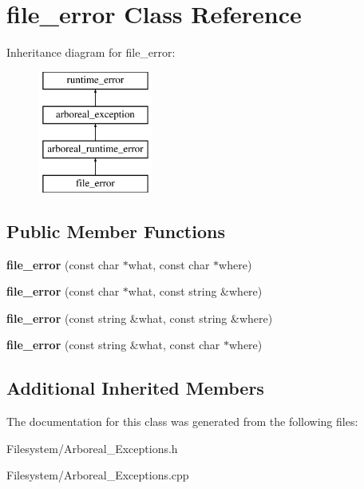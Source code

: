 \hypertarget{classfile__error}{}\section{file\+\_\+error Class Reference}
\label{classfile__error}
Inheritance diagram for file\+\_\+error\+:\begin{figure}[H]
\begin{center}
\leavevmode
\includegraphics[height=4.000000cm]{classfile__error}
\end{center}
\end{figure}
\subsection*{Public Member Functions}
\begin{DoxyCompactItemize}
\item 
\mbox{\label{classfile__error_ad1e39fb2d2fae7066afb0a5fd7d3ff95}} 
{\bfseries file\+\_\+error} (const char $\ast$what, const char $\ast$where)
\item 
\mbox{\label{classfile__error_a5f23b08102fc61c30e371c1e22bf407c}} 
{\bfseries file\+\_\+error} (const char $\ast$what, const string \&where)
\item 
\mbox{\label{classfile__error_a9fadb025f0b610e779ad25ba6c34f848}} 
{\bfseries file\+\_\+error} (const string \&what, const string \&where)
\item 
\mbox{\label{classfile__error_a714fe8ba3b7f1a443d434ed9b8965992}} 
{\bfseries file\+\_\+error} (const string \&what, const char $\ast$where)
\end{DoxyCompactItemize}
\subsection*{Additional Inherited Members}


The documentation for this class was generated from the following files\+:\begin{DoxyCompactItemize}
\item 
Filesystem/Arboreal\+\_\+\+Exceptions.\+h\item 
Filesystem/Arboreal\+\_\+\+Exceptions.\+cpp\end{DoxyCompactItemize}
